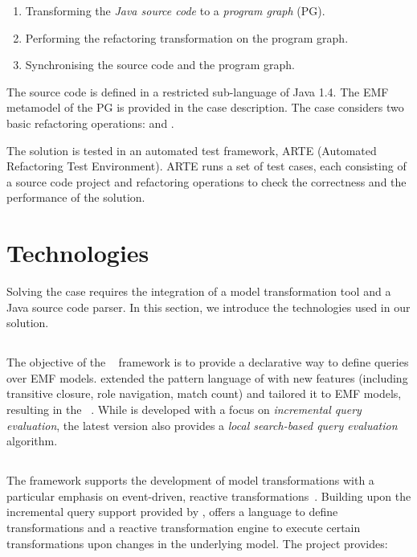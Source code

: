 \documentclass[submission,copyright,creativecommons]{eptcs}
\makeatletter
\newcommand{\pum}{\ttcsf{Pull Up Method}\@\xspace}
\newcommand{\cscz}{\ttcsf{Create Superclass}\@\xspace}
\makeatother
\begin{document}
\begin{enumerate}[noitemsep]
\item Transforming the \emph{Java source code} to a \emph{program graph} (PG).
\item Performing the refactoring transformation on the program graph.
\item Synchronising the source code and the program graph.
\end{enumerate}

The source code is defined in a restricted sub-language of Java 1.4. The EMF metamodel of the PG is provided in the case description. The case considers two basic refactoring operations: \pum and \cscz.

The solution is tested in an automated test framework, ARTE (Automated Refactoring Test Environment). ARTE runs a set of test cases, each consisting of a source code project and refactoring operations to check the correctness and the performance of the solution.

\section{Technologies}

Solving the case requires the integration of a model transformation tool and a Java source code parser. In this section, we introduce the technologies used in our solution.

\subsection{\eiq}

The objective of the \eiq~\cite{models2010, eiq-homepage} framework is to provide a declarative way to define queries over EMF models. \eiq extended the pattern language of \viatratwo with new features (including transitive closure, role navigation, match count) and tailored it to EMF models, resulting in the \iqpl~\cite{iqpl}. While \eiq is developed with a focus on \emph{incremental query evaluation}, the latest version also provides a \emph{local search-based query evaluation} algorithm.

\subsection{\viatra}

The \viatra framework supports the development of model transformations with a particular emphasis on event-driven, reactive transformations~\cite{viatra}. Building upon the incremental query support provided by \eiq, \viatra offers a language to define transformations and a reactive transformation engine to execute certain transformations upon changes in the underlying model. The \viatra project provides:
\end{document}

